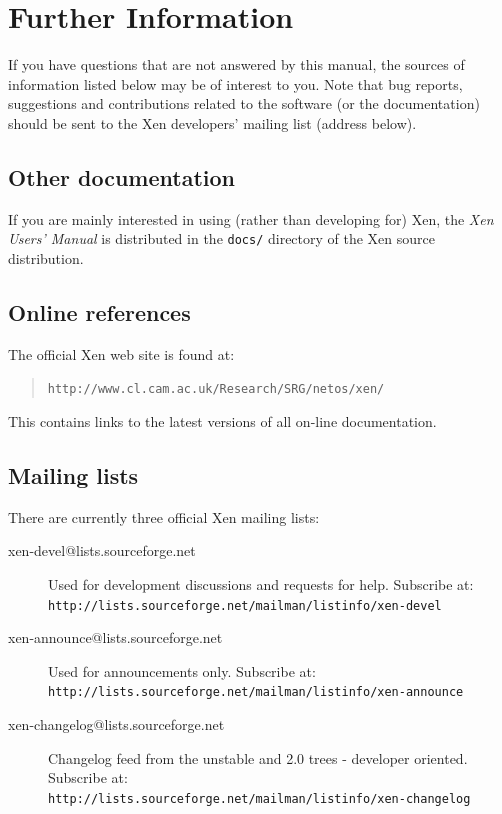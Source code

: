 \documentclass[11pt,twoside,final,openright]{xenstyle}
\begin{document}


\chapter{Further Information} 


If you have questions that are not answered by this manual, the
sources of information listed below may be of interest to you.  Note
that bug reports, suggestions and contributions related to the
software (or the documentation) should be sent to the Xen developers'
mailing list (address below).

\section{Other documentation}

If you are mainly interested in using (rather than developing for)
Xen, the {\em Xen Users' Manual} is distributed in the {\tt docs/}
directory of the Xen source distribution.  


\section{Online references}

The official Xen web site is found at:
\begin{quote}
{\tt http://www.cl.cam.ac.uk/Research/SRG/netos/xen/}
\end{quote}

This contains links to the latest versions of all on-line 
documentation. 

\section{Mailing lists}

There are currently three official Xen mailing lists:

\begin{description}
\item[xen-devel@lists.sourceforge.net] Used for development
discussions and requests for help.  Subscribe at: \\
{\small {\tt http://lists.sourceforge.net/mailman/listinfo/xen-devel}}
\item[xen-announce@lists.sourceforge.net] Used for announcements only.
Subscribe at: \\
{\small {\tt http://lists.sourceforge.net/mailman/listinfo/xen-announce}}
\item[xen-changelog@lists.sourceforge.net]  Changelog feed
from the unstable and 2.0 trees - developer oriented.  Subscribe at: \\
{\small {\tt http://lists.sourceforge.net/mailman/listinfo/xen-changelog}}
\end{description}
\end{document}
